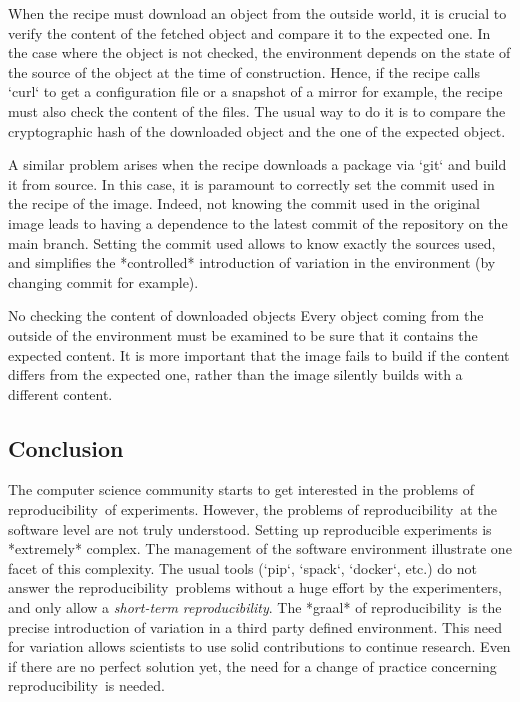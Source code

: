 \documentclass[sigconf]{acmart}
\newcommand{\repro}{reproducibility}
\begin{document}
When the recipe must download an object from the outside world, it is crucial to verify the content of the fetched object and compare it to the expected one.
In the case where the object is not checked, the environment depends on the state of the source of the object at the time of construction.
Hence, if the recipe calls `curl` to get a configuration file or a snapshot of a mirror for example, the recipe must also check the content of the files.
The usual way to do it is to compare the cryptographic hash of the downloaded object and the one of the expected object. 


A similar problem arises when the recipe downloads a package via `git` and build it from source.
In this case, it is paramount to correctly set the commit used in the recipe of the image.
Indeed, not knowing the commit used in the original image leads to having a dependence to the latest commit of the repository on the main branch.
Setting the commit used allows to know exactly the sources used, and simplifies the *controlled* introduction of variation in the environment (by changing commit for example). 

\begin{trap}{No checking the content of downloaded objects}{}
Every object coming from the outside of the environment must be examined to be sure that it contains the expected content. 
It is more important that the image fails to build if the content differs from the expected one, rather than the image silently builds with a different content.
\end{trap}

\subsection{Conclusion}

The computer science community starts to get interested in the problems of \repro\ of experiments.
However, the problems of \repro\ at the software level are not truly understood.
Setting up reproducible experiments is *extremely* complex.
The management of the software environment illustrate one facet of this complexity.
The usual tools (`pip`, `spack`, `docker`, etc.) do not answer the \repro\ problems without a huge effort by the experimenters, and only allow a \emph{short-term \repro}.
The *graal* of \repro\ is the precise introduction of variation in a third party defined environment.
This need for variation allows scientists to use solid contributions to continue research.
Even if there are no perfect solution yet, the need for a change of practice concerning \repro\ is needed.
\end{document}

